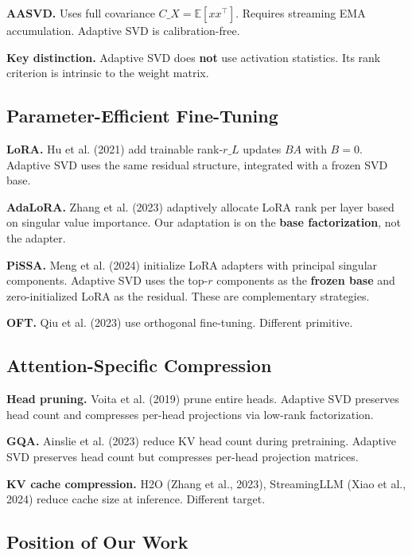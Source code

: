 \textbf{AASVD.} Uses full covariance $C\_X = \mathbb{E}[x x^\top]$. Requires 
streaming EMA accumulation. Adaptive SVD is calibration-free.

\textbf{Key distinction.} Adaptive SVD does \textbf{not} use activation statistics. Its 
rank criterion is intrinsic to the weight matrix.

\subsection{Parameter-Efficient Fine-Tuning}

\textbf{LoRA.} Hu et al. (2021) add trainable rank-$r\_L$ updates $B A$ with $B = 0$. 
Adaptive SVD uses the same residual structure, integrated with a frozen SVD base.

\textbf{AdaLoRA.} Zhang et al. (2023) adaptively allocate LoRA rank per layer based 
on singular value importance. Our adaptation is on the \textbf{base factorization}, 
not the adapter.

\textbf{PiSSA.} Meng et al. (2024) initialize LoRA adapters with principal singular 
components. Adaptive SVD uses the top-$r$ components as the \textbf{frozen base} 
and zero-initialized LoRA as the residual. These are complementary strategies.

\textbf{OFT.} Qiu et al. (2023) use orthogonal fine-tuning. Different primitive.

\subsection{Attention-Specific Compression}

\textbf{Head pruning.} Voita et al. (2019) prune entire heads. Adaptive SVD preserves 
head count and compresses per-head projections via low-rank factorization.

\textbf{GQA.} Ainslie et al. (2023) reduce KV head count during pretraining. Adaptive 
SVD preserves head count but compresses per-head projection matrices.

\textbf{KV cache compression.} H2O (Zhang et al., 2023), StreamingLLM (Xiao et al., 
2024) reduce cache size at inference. Different target.

\subsection{Position of Our Work}

